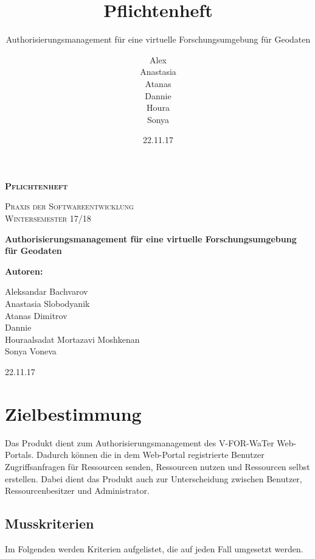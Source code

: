 \documentclass[parskip=full,11pt]{scrartcl}
\title{Pflichtenheft}
\subtitle{Authorisierungsmanagement für eine virtuelle Forschungsumgebung für Geodaten}
\author{Alex\\Anastasia\\Atanas\\Dannie\\ Houra\\Sonya\\}
\date{22.11.17}
\begin{document}
\begin{titlepage}
	
	\begin{center}
	{\scshape\LARGE\bfseries Pflichtenheft \par}
	\vspace{1cm}
	{\scshape\Large Praxis der Softwareentwicklung\\}
	\vspace{1cm}
	{\scshape\Large Wintersemester 17/18\\}
	\vspace{3cm}
	{\huge\bfseries Authorisierungsmanagement für eine virtuelle Forschungsumgebung für Geodaten\par}
	\vspace{2cm}
	\vfill
	{\bfseries {\Large Autoren}:\par}
	{\Large Aleksandar Bachvarov}\\
	{\Large Anastasia Slobodyanik}\\
	{\Large Atanas Dimitrov}\\
	{\Large Dannie}\\%
	{\Large Houraalsadat Mortazavi Moshkenan}\\
	{\Large Sonya Voneva}\\
	\vfill
	{\large 22.11.17 \par}
	\end{center}
\end{titlepage}
\tableofcontents

\newpage
\section{Zielbestimmung}
Das Produkt dient zum Authorisierungsmanagement des \gls{V-FOR-WaTer} Web-Portals. Dadurch können die in dem \gls{Web-Portal} registrierte \gls{Benutzer} Zugriffsanfragen für Ressourcen senden, Ressourcen nutzen und Ressourcen selbst erstellen. Dabei dient das Produkt auch zur Unterscheidung zwischen Benutzer, \gls{Ressourcenbesitzer} und \gls{Administrator}.

\subsection{Musskriterien}
Im Folgenden werden Kriterien aufgelistet, die auf jeden Fall umgesetzt werden.
\end{document}
